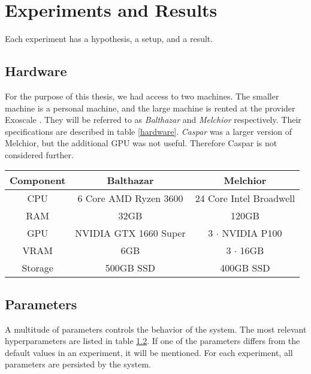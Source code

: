\chapter{Experiments and Results}
\label{experiments-and-results}

Each experiment has a hypothesis, a setup, and a result.

\section{Hardware}
For the purpose of this thesis, we had access to two machines. The smaller machine is a personal machine, and the large machine is rented at the provider Exoscale \cite{noauthor_exoscale_nodate}. They will be referred to as \textit{Balthazar} and \textit{Melchior} respectively. Their specifications are described in table \ref{hardware}. \textit{Caspar} was a larger version of Melchior, but the additional GPU was not useful. Therefore Caspar is not considered further.

\begin{table*}[!h]
    \begin{center}
        \begin{tabular}{ c|c|c }
            Component & Balthazar             & Melchior                \\
            \hline
            \hline
            CPU       & 6 Core AMD Ryzen 3600 & 24 Core Intel Broadwell \\
            RAM       & 32GB                  & 120GB                   \\
            GPU       & NVIDIA GTX 1660 Super & 3 $\cdot$ NVIDIA P100   \\
            VRAM      & 6GB                   & 3 $\cdot$ 16GB          \\
            Storage   & 500GB SSD             & 400GB SSD               \\
        \end{tabular}
    \end{center}
    \caption{Hardware specifications of the utilized machines}
    \label{hardware}
\end{table*}

\section{Parameters}
\label{parameters}
A multitude of parameters controls the behavior of the system. The most relevant hyperparameters are listed in table \ref{parameters}. If one of the parameters differs from the default values in an experiment, it will be mentioned. For each experiment, all parameters are persisted by the system.

